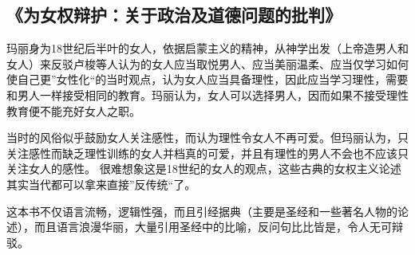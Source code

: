 \subsection{《为女权辩护：关于政治及道德问题的批判》}
玛丽身为18世纪后半叶的女人，依据启蒙主义的精神，从神学出发（上帝造男人和女人）来反驳卢梭等人认为的女人应当取悦男人、应当美丽温柔、应当仅学习如何使自己更”女性化“的当时观点，认为女人应当具备理性，因此应当学习理性，需要和男人一样接受相同的教育。玛丽认为，女人可以选择男人，因而如果不接受理性教育便不能充好女人之职。
 
当时的风俗似乎鼓励女人关注感性，而认为理性令女人不再可爱。但玛丽认为，只关注感性而缺乏理性训练的女人并档真的可爱，并且有理性的男人不会也不应该只关注女人的感性。 
很难想象这是18世纪的女人的观点，这些古典的女权主义论述其实当代都可以拿来直接”反传统“了。 

这本书不仅语言流畅，逻辑性强，而且引经据典（主要是圣经和一些著名人物的论述），而且语言浪漫华丽，大量引用圣经中的比喻，反问句比比皆是，令人无可辩驳。